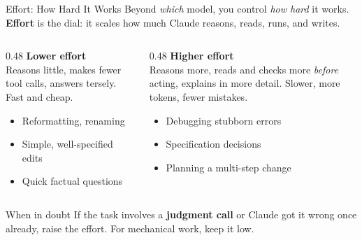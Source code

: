 \documentclass[aspectratio=169, 11pt]{beamer}
\begin{document}
\begin{frame}{Effort: How Hard It Works}
  Beyond \emph{which} model, you control \emph{how hard} it works. \textbf{Effort} is the dial: it scales how much Claude reasons, reads, runs, and writes.

  \vspace{0.6em}
  \begin{columns}[T]
    \begin{column}{0.48\textwidth}
      \textbf{Lower effort}\\[0.3em]
      {\small Reasons little, makes fewer tool calls, answers tersely. Fast and cheap.}
      \begin{itemize}
        \item Reformatting, renaming
        \item Simple, well-specified edits
        \item Quick factual questions
      \end{itemize}
    \end{column}
    \begin{column}{0.48\textwidth}
      \textbf{Higher effort}\\[0.3em]
      {\small Reasons more, reads and checks more \textit{before} acting, explains in more detail. Slower, more tokens, fewer mistakes.}
      \begin{itemize}
        \item Debugging stubborn errors
        \item Specification decisions
        \item Planning a multi-step change
      \end{itemize}
    \end{column}
  \end{columns}

  \vspace{0.6em}
  \begin{alertblock}{When in doubt}
    If the task involves a \textbf{judgment call} or Claude got it wrong once already, raise the effort. For mechanical work, keep it low.
  \end{alertblock}
\end{frame}
\end{document}
